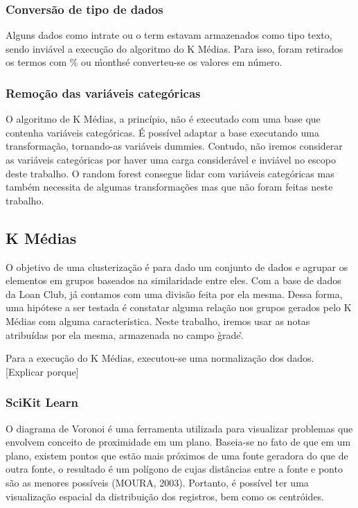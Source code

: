 \subsubsection{Conversão de tipo de dados}
Alguns dados como intrate ou o term estavam armazenados como tipo texto, sendo inviável a execução do algoritmo do K Médias. Para isso, foram retirados os termos com \% ou \'months\' e converteu-se os valores em número.


\subsubsection{Remoção das variáveis categóricas}
O algoritmo de K Médias, a princípio, não é executado com uma base que contenha variáveis categóricas. É possível adaptar a base executando uma transformação, tornando-as variáveis dummies. Contudo, não iremos considerar as variáveis categóricas por haver uma carga considerável e inviável no escopo deste trabalho. O random forest consegue lidar com variáveis categóricas mas também necessita de algumas transformações mas que não foram feitas neste trabalho.

\subsection{K Médias}

O objetivo de uma clusterização é para dado um conjunto de dados e agrupar os elementos em grupos baseados na similaridade entre eles. Com a base de dados da Loan Club, já contamos com uma divisão feita por ela mesma. Dessa forma, uma hipótese a ser testada é constatar alguma relação nos grupos gerados pelo K Médias com alguma característica. Neste trabalho, iremos usar as notas atribuídas por ela mesma, armazenada no campo \`grade\`.

Para a execução do K Médias, executou-se uma normalização dos dados. [Explicar porque]

\subsubsection{SciKit Learn}


O diagrama de Voronoi é uma ferramenta utilizada para visualizar problemas que envolvem conceito de proximidade em um plano. Baseia-se no fato de que em um plano, existem pontos que estão mais próximos de uma fonte geradora do que de outra fonte, o resultado é um polígono de cujas distâncias entre a fonte e ponto são as menores possíveis (MOURA, 2003). Portanto, é possível ter uma visualização espacial da distribuição dos registros, bem como os centróides.

